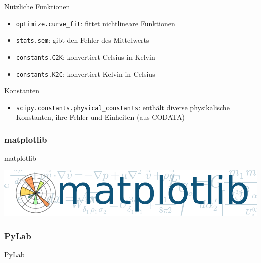 \begin{frame}{Nützliche Funktionen}
  \begin{itemize}
    \item \texttt{optimize.curve\_fit}: fittet nichtlineare Funktionen
    \item \texttt{stats.sem}: gibt den Fehler des Mittelwerts
    \item \texttt{constants.C2K}: konvertiert Celsius in Kelvin
    \item \texttt{constants.K2C}: konvertiert Kelvin in Celsius
  \end{itemize}
\end{frame}

\begin{frame}{Konstanten}
  \begin{itemize}
    \item \texttt{scipy.constants.physical\_constants}: enthält diverse physikalische Konstanten, ihre Fehler und Einheiten (aus CODATA)
  \end{itemize}
\end{frame}

\subsubsection{matplotlib}
\begin{frame}{matplotlib}
  \begin{center}
    \includegraphics[width=\textwidth]{../Notes/img/matplotlib.pdf}
  \end{center}
\end{frame}
\subsubsection{PyLab}
\begin{frame}{PyLab}
\end{frame}
